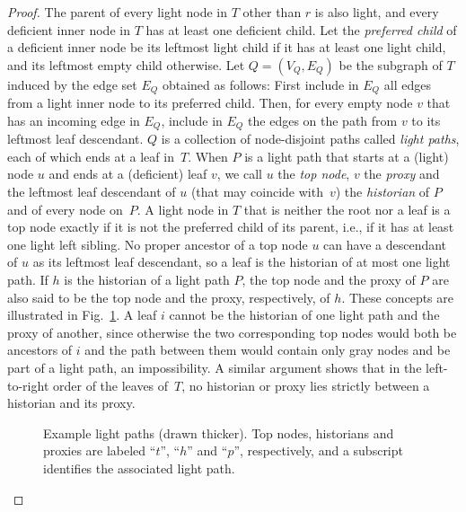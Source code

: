 \documentclass[envcountsame,envcountsect,undated,nolinenumbers]{lnthi}
\begin{document}
\begin{proof}
The parent of every light node in $T$ other than $r$
is also light, and
every deficient inner node in $T$ has at least
one deficient child.
Let the \emph{preferred child} of a deficient
inner node be its leftmost light child if
it has at least one light child, and its leftmost
empty child otherwise.
Let $Q=(V_Q,E_Q)$ be the subgraph of $T$ induced
by the edge set $E_Q$ obtained as follows:
First include in $E_Q$ all edges
from a light inner node to its preferred child.
Then, for every empty node $v$
that has an incoming edge in $E_Q$,
include in $E_Q$ the edges on the path
from $v$ to its leftmost leaf descendant.
$Q$ is a collection of node-disjoint paths
called \emph{light paths}, each of which ends
at a leaf in~$T$.
When $P$ is a light path that starts at a (light) node
$u$ and ends at a (deficient) leaf $v$, we call $u$ the
\emph{top node}, $v$ the \emph{proxy}
and the leftmost leaf descendant of $u$
(that may coincide with~$v$)
the \emph{historian} of $P$ and of every node on~$P$.
A light node in $T$ that is neither the root nor a leaf
is a top node exactly if it is not the preferred child
of its parent, i.e., if it has at least one
light left sibling.
No proper ancestor of a top node $u$ can have
a descendant of $u$ as its leftmost leaf descendant,
so a leaf is the historian of at
most one light path.
If $h$ is the historian of a light path $P$, the
top node and the proxy of $P$ are also said to be the
top node and the proxy, respectively, of $h$.
These concepts are illustrated in Fig.~\ref{fig:lightpaths}.
A leaf $i$ cannot be the historian
of one light path and the proxy of another,
since otherwise the two corresponding
top nodes would both be ancestors of $i$
and the path between them would contain
only gray nodes and be
part of a light path, an impossibility.
A similar argument shows that in the
left-to-right order of the leaves of~$T$,
no historian or proxy lies
strictly between a historian and its proxy.

\begin{figure}
\begin{center}
\end{center}
\caption{Example light paths (drawn thicker).
Top nodes, historians and proxies are labeled
``$t$'', ``$h$'' and ``$p$'', respectively,
and a subscript identifies the associated
light path.}
\label{fig:lightpaths}
\end{figure}


\end{proof}
\end{document}

